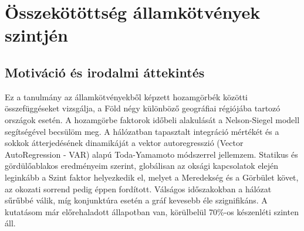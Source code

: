 \documentclass[12pt,bibliography=totoc]{article}
\begin{document}




\newpage 

\section{Összekötöttség államkötvények szintjén}
\subsection{Motiváció és irodalmi áttekintés}

Ez a tanulmány az államkötvényekből képzett hozamgörbék közötti összefüggéseket vizsgálja, a Föld négy különböző geográfiai régiójába tartozó országok esetén. A hozamgörbe faktorok időbeli alakulását a Nelson-Siegel modell segítségével becsülöm meg. A hálózatban tapasztalt integráció mértékét és a sokkok átterjedésének dinamikáját a vektor autoregresszió (Vector AutoRegression - VAR) alapú Toda-Yamamoto módszerrel jellemzem. Statikus és gördülőablakos eredményeim szerint, globálisan az oksági kapcsolatok elején leginkább a Szint faktor helyezkedik el, melyet a Meredekség és a Görbület követ, az okozati sorrend pedig éppen fordított. Válságos időszakokban a hálózat sűrűbbé válik, míg konjunktúra esetén a gráf kevesebb éle szignifikáns. A kutatásom már előrehaladott állapotban van, körülbelül 70\%-os készenléti szinten áll.
\end{document}
